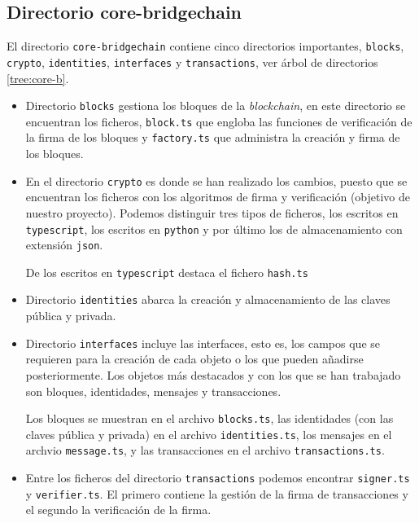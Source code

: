 \subsection{Directorio core-bridgechain}

El directorio \texttt{core-bridgechain} contiene cinco directorios importantes, \texttt{blocks}, \texttt{crypto}, \texttt{identities}, \texttt{interfaces} y \texttt{transactions}, ver árbol de directorios \ref{tree:core-b}.

\begin{itemize}
	\item Directorio \texttt{blocks} gestiona los bloques de la \textit{blockchain}, en este directorio se encuentran los ficheros, \texttt{block.ts} que engloba las funciones de verificación de la firma de los bloques y \texttt{factory.ts} que administra la creación y firma de los bloques.
	\item En el directorio \texttt{crypto} es donde se han realizado los cambios, puesto que se encuentran los ficheros con los algoritmos de firma y verificación (objetivo de nuestro proyecto). Podemos distinguir tres tipos de ficheros, los escritos en \texttt{typescript}, los escritos en \texttt{python} y por último los de almacenamiento con extensión \texttt{json}.
	
	De los escritos en \texttt{typescript} destaca el fichero \texttt{hash.ts}
	
	
	
	\item Directorio \texttt{identities} abarca la creación y almacenamiento de las claves pública y privada.
	\item Directorio \texttt{interfaces} incluye las interfaces, esto es, los campos que se requieren para la creación de cada objeto o los que pueden añadirse posteriormente. Los objetos más destacados y con los que se han trabajado son bloques, identidades, mensajes y transacciones.
	
	Los bloques se muestran en el archivo \texttt{blocks.ts}, las identidades (con las claves pública y privada) en el archivo \texttt{identities.ts}, los mensajes en el archvio \texttt{message.ts}, y las transacciones en el archivo \texttt{transactions.ts}.
	\item Entre los ficheros del directorio \texttt{transactions} podemos encontrar \texttt{signer.ts} y \texttt{verifier.ts}. El primero contiene la gestión de la firma de transacciones y el segundo la verificación de la firma.
\end{itemize}


